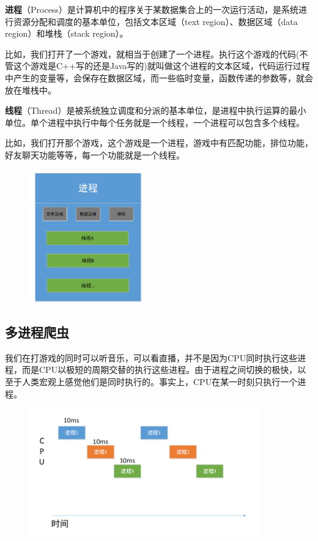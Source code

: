 \documentclass[UTF-8]{ctexart}
\begin{document}
\textbf{进程}（Process）是计算机中的程序关于某数据集合上的一次运行活动，是系统进行资源分配和调度的基本单位，包括文本区域（text region）、数据区域（data region）和堆栈（stack region）。

比如，我们打开了一个游戏，就相当于创建了一个进程。执行这个游戏的代码(不管这个游戏是C++写的还是Java写的)就叫做这个进程的文本区域，代码运行过程中产生的变量等，会保存在数据区域，而一些临时变量，函数传递的参数等，就会放在堆栈中。

   \textbf{线程}（Thread）是被系统独立调度和分派的基本单位，是进程中执行运算的最小单位。单个进程中执行中每个任务就是一个线程，一个进程可以包含多个线程。

比如，我们打开那个游戏，这个游戏是一个进程，游戏中有匹配功能，排位功能，好友聊天功能等等，每一个功能就是一个线程。


\begin{figure}[h]
  \centering
  \includegraphics[width=5cm]{3.png}
\end{figure}


\subsection{多进程爬虫}

我们在打游戏的同时可以听音乐，可以看直播，并不是因为CPU同时执行这些进程，而是CPU以极短的周期交替的执行这些进程。由于进程之间切换的极快，以至于人类宏观上感觉他们是同时执行的。事实上，CPU在某一时刻只执行一个进程。

\begin{figure}[h]
  \centering
  \includegraphics[width=10cm]{4.png}
\end{figure}
\end{document}
